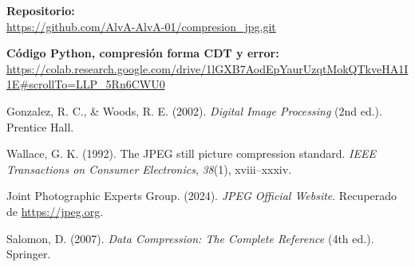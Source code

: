 \documentclass[8pt,a4paper]{article}
\theoremstyle{definition}
\theoremstyle{remark}
\begin{document}
\begin{multicols}{2}
\begin{flushleft}
\textbf{Repositorio:} \\
\url{https://github.com/AlvA-AlvA-01/compresion_jpg.git}

\vspace{1em}

\textbf{Código Python, compresión forma CDT y error:} \\
\url{https://colab.research.google.com/drive/1lGXB7AodEpYaurUzqtMokQTkveHA1I1E#scrollTo=LLP_5Rn6CWU0}
\end{flushleft}
        
    \begin{thebibliography}{00}
	
	        \newblock Gonzalez, R. C., \& Woods, R. E. (2002). \textit{Digital Image Processing} (2nd ed.). Prentice Hall.
	
	    Wallace, G. K. (1992). The JPEG still picture compression          standard. \textit{IEEE Transactions on Consumer Electronics}, \textit{38}(1),          xviii--xxxiv.
	
	        \newblock Joint Photographic Experts Group. (2024). \textit{JPEG Official Website}. Recuperado de \newblock \textcolor{blue}
            {\url{https://jpeg.org}.}

            Salomon, D. (2007). \textit{Data Compression: The Complete Reference} (4th ed.). Springer.
	
        \end{thebibliography}
           
\end{multicols}
    
\end{document}
